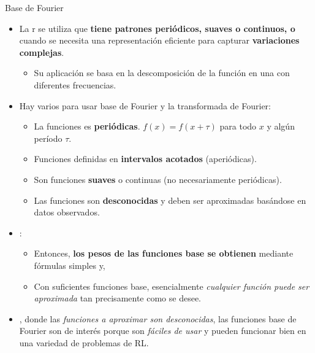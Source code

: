\documentclass[10pt, envcountsect, handout, aspectratio=1610, hyperref={hypertexnames=true}]{beamer}
\begin{document}
\begin{frame}{Base de Fourier}
	
	\begin{itemize}
		\item La r se utiliza  que \textbf{tiene patrones periódicos, suaves o continuos, o} cuando se necesita una representación eficiente para capturar \textbf{variaciones complejas}. 
		
		\begin{itemize}
			\item Su aplicación se basa en la descomposición de la función en una  con diferentes frecuencias.
		\end{itemize}
		
		\item Hay varios  para usar base de Fourier y la transformada de Fourier:
			\begin{itemize}
				\item La funciones es \textbf{periódicas}. \(f(x) = f(x + \tau)\) para todo \(x\) y algún período \(\tau\). 
				\item Funciones definidas en \textbf{intervalos acotados} (aperiódicas).
				\item Son funciones \textbf{suaves} o continuas (no necesariamente periódicas).
				\item Las funciones son \textbf{desconocidas} y deben ser aproximadas basándose en datos observados.
			\end{itemize}
		
		\item {}:  
		\begin{itemize}
			\item Entonces, \textbf{los pesos de las funciones base se obtienen} mediante fórmulas simples y,  
			\item Con suficientes funciones base, esencialmente \textit{cualquier función puede ser aproximada} tan precisamente como se desee.  
		\end{itemize}
		
		\item {}, donde las \textit{funciones a aproximar son desconocidas}, las funciones base de Fourier son de interés porque son \textit{fáciles de usar} y pueden funcionar bien en una variedad de problemas de RL.  

		
	\end{itemize}		
\end{frame}
\end{document}
